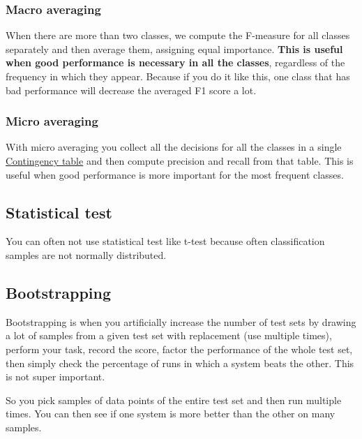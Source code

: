 \documentclass[
  11pt,
  british,
]{article}
\begin{document}
\hypertarget{macro-averaging}{%
\subsubsection{Macro averaging}\label{macro-averaging}}

When there are more than two classes, we compute the F-measure for all
classes separately and then average them, assigning equal importance.
\textbf{This is useful when good performance is necessary in all the
classes}, regardless of the frequency in which they appear. Because if
you do it like this, one class that has bad performance will decrease
the averaged F1 score a lot.

\hypertarget{micro-averaging}{%
\subsubsection{Micro averaging}\label{micro-averaging}}

With micro averaging you collect all the decisions for all the classes
in a single \href{Contingency\%20table.md}{Contingency table} and then
compute precision and recall from that table. This is useful when good
performance is more important for the most frequent classes.

\hypertarget{statistical-test}{%
\subsection{Statistical test}\label{statistical-test}}

You can often not use statistical test like t-test because often
classification samples are not normally distributed.

\hypertarget{bootstrapping}{%
\subsection{Bootstrapping}\label{bootstrapping}}

Bootstrapping is when you artificially increase the number of test sets
by drawing a lot of samples from a given test set with replacement (use
multiple times), perform your task, record the score, factor the
performance of the whole test set, then simply check the percentage of
runs in which a system beats the other. This is not super important.

So you pick samples of data points of the entire test set and then run
multiple times. You can then see if one system is more better than the
other on many samples.
\end{document}
